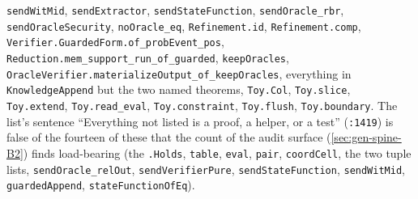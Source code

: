 \texttt{sendWitMid}, \texttt{sendExtractor}, \texttt{sendStateFunction}, \texttt{sendOracle\_\allowbreak{}rbr}, \texttt{sendOracleSecurity}, \texttt{noOracle\_\allowbreak{}eq}, \texttt{Refinement.\allowbreak{}id}, \texttt{Refinement.\allowbreak{}comp}, \texttt{V\allowbreak{}e\allowbreak{}r\allowbreak{}i\allowbreak{}f\allowbreak{}i\allowbreak{}e\allowbreak{}r\allowbreak{}.\allowbreak{}G\allowbreak{}u\allowbreak{}a\allowbreak{}r\allowbreak{}d\allowbreak{}e\allowbreak{}d\allowbreak{}F\allowbreak{}o\allowbreak{}r\allowbreak{}m\allowbreak{}.\allowbreak{}o\allowbreak{}f\allowbreak{}\_\allowbreak{}p\allowbreak{}r\allowbreak{}o\allowbreak{}b\allowbreak{}E\allowbreak{}v\allowbreak{}e\allowbreak{}n\allowbreak{}t\allowbreak{}\_\allowbreak{}p\allowbreak{}o\allowbreak{}s}, \texttt{R\allowbreak{}e\allowbreak{}d\allowbreak{}u\allowbreak{}c\allowbreak{}t\allowbreak{}i\allowbreak{}o\allowbreak{}n\allowbreak{}.\allowbreak{}m\allowbreak{}e\allowbreak{}m\allowbreak{}\_\allowbreak{}s\allowbreak{}u\allowbreak{}p\allowbreak{}p\allowbreak{}o\allowbreak{}r\allowbreak{}t\allowbreak{}\_\allowbreak{}r\allowbreak{}u\allowbreak{}n\allowbreak{}\_\allowbreak{}o\allowbreak{}f\allowbreak{}\_\allowbreak{}g\allowbreak{}u\allowbreak{}a\allowbreak{}r\allowbreak{}d\allowbreak{}e\allowbreak{}d}, \texttt{keepOracles}, \texttt{O\allowbreak{}r\allowbreak{}a\allowbreak{}c\allowbreak{}l\allowbreak{}e\allowbreak{}V\allowbreak{}e\allowbreak{}r\allowbreak{}i\allowbreak{}f\allowbreak{}i\allowbreak{}e\allowbreak{}r\allowbreak{}.\allowbreak{}m\allowbreak{}a\allowbreak{}t\allowbreak{}e\allowbreak{}r\allowbreak{}i\allowbreak{}a\allowbreak{}l\allowbreak{}i\allowbreak{}z\allowbreak{}e\allowbreak{}O\allowbreak{}u\allowbreak{}t\allowbreak{}p\allowbreak{}u\allowbreak{}t\allowbreak{}\_\allowbreak{}o\allowbreak{}f\allowbreak{}\_\allowbreak{}k\allowbreak{}e\allowbreak{}e\allowbreak{}p\allowbreak{}O\allowbreak{}r\allowbreak{}a\allowbreak{}c\allowbreak{}l\allowbreak{}e\allowbreak{}s}, everything in \texttt{KnowledgeAppend} but the two named theorems, \texttt{Toy.\allowbreak{}Col}, \texttt{Toy.\allowbreak{}slice}, \texttt{Toy.\allowbreak{}extend}, \texttt{Toy.\allowbreak{}read\_\allowbreak{}eval}, \texttt{Toy.\allowbreak{}constraint}, \texttt{Toy.\allowbreak{}flush}, \texttt{Toy.\allowbreak{}boundary}. The list's sentence \enquote{Everything not listed is a proof, a helper, or a test} (\texttt{:1419}) is false of the fourteen of these that the count of the audit surface (\cref{sec:gen-spine-B2}) finds load-bearing (the \texttt{.\allowbreak{}Holds}, \texttt{table}, \texttt{eval}, \texttt{pair}, \texttt{coordCell}, the two tuple lists, \texttt{sendOracle\_\allowbreak{}relOut}, \texttt{sendVerifierPure}, \texttt{sendStateFunction}, \texttt{sendWitMid}, \texttt{guardedAppend}, \texttt{stateFunctionOfEq}).

